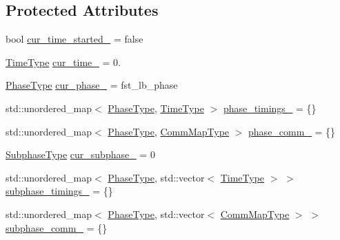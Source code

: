 \subsection*{Protected Attributes}
\begin{DoxyCompactItemize}
\item 
bool \hyperlink{structvt_1_1elm_1_1_element_l_b_data_ae2b4a8fc5193e7aa7bc691ab1a7011ce}{cur\+\_\+time\+\_\+started\+\_\+} = false
\item 
\hyperlink{namespacevt_a876a9d0cd5a952859c72de8a46881442}{Time\+Type} \hyperlink{structvt_1_1elm_1_1_element_l_b_data_a025fe8411b1c1458109afd4d793e9280}{cur\+\_\+time\+\_\+} = 0.
\item 
\hyperlink{namespacevt_a46ce6733d5cdbd735d561b7b4029f6d7}{Phase\+Type} \hyperlink{structvt_1_1elm_1_1_element_l_b_data_af82526bf8ad50c6460ba51ffc1c92a43}{cur\+\_\+phase\+\_\+} = fst\+\_\+lb\+\_\+phase
\item 
std\+::unordered\+\_\+map$<$ \hyperlink{namespacevt_a46ce6733d5cdbd735d561b7b4029f6d7}{Phase\+Type}, \hyperlink{namespacevt_a876a9d0cd5a952859c72de8a46881442}{Time\+Type} $>$ \hyperlink{structvt_1_1elm_1_1_element_l_b_data_a21d18c146da6f3631829cb35e9490c0a}{phase\+\_\+timings\+\_\+} = \{\}
\item 
std\+::unordered\+\_\+map$<$ \hyperlink{namespacevt_a46ce6733d5cdbd735d561b7b4029f6d7}{Phase\+Type}, \hyperlink{namespacevt_1_1elm_a38487cb8896b9b4763efa9022fab560e}{Comm\+Map\+Type} $>$ \hyperlink{structvt_1_1elm_1_1_element_l_b_data_a343d66fb777c54e0bdaaddf6f54eda85}{phase\+\_\+comm\+\_\+} = \{\}
\item 
\hyperlink{namespacevt_ae78cbfdf1e57470e33eedb074f2beeba}{Subphase\+Type} \hyperlink{structvt_1_1elm_1_1_element_l_b_data_a0489c5190d8a81bd5a4fba5d80d03d5d}{cur\+\_\+subphase\+\_\+} = 0
\item 
std\+::unordered\+\_\+map$<$ \hyperlink{namespacevt_a46ce6733d5cdbd735d561b7b4029f6d7}{Phase\+Type}, std\+::vector$<$ \hyperlink{namespacevt_a876a9d0cd5a952859c72de8a46881442}{Time\+Type} $>$ $>$ \hyperlink{structvt_1_1elm_1_1_element_l_b_data_ae8d11d0e5d42492873cf8a3a0e90470b}{subphase\+\_\+timings\+\_\+} = \{\}
\item 
std\+::unordered\+\_\+map$<$ \hyperlink{namespacevt_a46ce6733d5cdbd735d561b7b4029f6d7}{Phase\+Type}, std\+::vector$<$ \hyperlink{namespacevt_1_1elm_a38487cb8896b9b4763efa9022fab560e}{Comm\+Map\+Type} $>$ $>$ \hyperlink{structvt_1_1elm_1_1_element_l_b_data_a3f4708b0c2d8af6627ee6df925b95890}{subphase\+\_\+comm\+\_\+} = \{\}
\end{DoxyCompactItemize}
